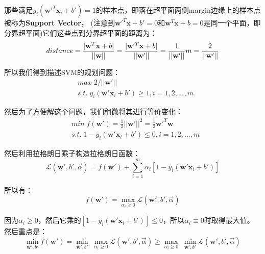 \documentclass{article}
\begin{document}
那些满足$y_i(\textbf{w}'^T\textbf{x}_i+b')= 1$的样本点，即落在超平面两侧margin边缘上的样本点被称为\textbf{Support Vector}，
(注意到$\textbf{w}'^T\textbf{x}+b'=0$和$\textbf{w}^T\textbf{x}+b=0$是同一个平面，即分界超平面)它们这些点到分界超平面的距离为：
\begin{equation}
	distance=\frac{|\textbf{w}^T\textbf{x}+b|}{||\textbf{w}||}=\frac{|\textbf{w}'^T\textbf{x}+b|}{||\textbf{w}'||}=\frac{1}{||\textbf{w}'||}\\
	m=\frac{2}{||\textbf{w}'||}
\end{equation}

所以我们得到描述SVM的规划问题：
\begin{equation}
	\begin{aligned}
		& max\;2/||\textbf{w}'||\\
		& s.t.\;y_i(\textbf{w}'\textbf{x}_i+b')\geq 1,i=1,2,...,m
	\end{aligned}
\end{equation}

然后为了方便解这个问题，我们稍微将其进行等价变化：
\begin{equation}
	\begin{aligned}
		& min\;f(\textbf{w}')=\frac{1}{2}||\textbf{w}'||^2=\frac{1}{2}\textbf{w}'^T\textbf{w}\\
		& s.t.\;1-y_i(\textbf{w}'\textbf{x}_i+b')\leq 0,i=1,2,...,m
	\end{aligned}
\end{equation}

然后利用拉格朗日乘子构造拉格朗日函数：
\begin{equation}
	\mathcal{L}(\textbf{w}',b',\overrightarrow{\alpha})=f(\textbf{w}')+\sum_{i=1}^m\alpha_i[1-y_i(\textbf{w}'\textbf{x}_i+b')]
\end{equation}

所以有：
\begin{equation}
	f(\textbf{w}')= \mathop{max}\limits_{\alpha_i\geq 0}\mathcal{L}(\textbf{w}',b',\overrightarrow{\alpha})
\end{equation}

因为$\alpha_i\geq 0$，然后它乘的$[1-y_i(\textbf{w}'\textbf{x}_i+b')]\leq 0$，所以$\alpha_i\equiv 0$时取得最大值。
然后重点是：
\begin{equation}
	\mathop{min}\limits_{\textbf{w}',b'}f(\textbf{w}')=\mathop{min}\limits_{\textbf{w}',b'}\;\mathop{max}\limits_{\alpha_i\geq 0}\mathcal{L}(\textbf{w}',b',\overrightarrow{\alpha})\geq \mathop{max}\limits_{\alpha_i\geq 0}\;\mathop{min}\limits_{\textbf{w}',b'}\mathcal{L}(\textbf{w}',b',\overrightarrow{\alpha})
\end{equation}
\end{document}
